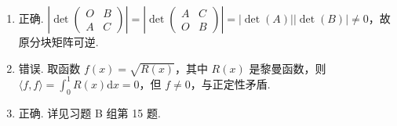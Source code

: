 \begin{enumerate}
\begin{enumerate}
        \item 正确. $\left|\det\begin{pmatrix}
            O & B \\
            A & C
        \end{pmatrix}\right| = \left|\det\begin{pmatrix}
            A & C \\
            O & B
        \end{pmatrix}\right| = |\det(A)||\det(B)| \neq 0$，故原分块矩阵可逆.

        \item 错误. 取函数 $f(x) = \sqrt{R(x)}$，其中 $R(x)$ 是黎曼函数，则 $\langle f, f \rangle = \int_0^1 R(x) \mathrm{d}x = 0$，但 $f \neq 0$，与正定性矛盾.
        \item 正确. 详见习题 B 组第 15 题.
    \end{enumerate}
\end{enumerate}

\clearpage
